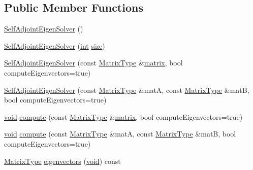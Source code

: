 \subsection*{Public Member Functions}
\begin{DoxyCompactItemize}
\item 
\hyperlink{class_self_adjoint_eigen_solver_af4cf372d440482d00ce9d00b9e8864df}{Self\-Adjoint\-Eigen\-Solver} ()
\item 
\hyperlink{class_self_adjoint_eigen_solver_ac3e972b81c5e3b2beb99f24a844be445}{Self\-Adjoint\-Eigen\-Solver} (\hyperlink{ioapi_8h_a787fa3cf048117ba7123753c1e74fcd6}{int} \hyperlink{glext_8h_a014d89bd76f74ef3a29c8f04b473eb76}{size})
\item 
\hyperlink{class_self_adjoint_eigen_solver_af0b2454eac09d3e0a2c3d9d3c101b9b0}{Self\-Adjoint\-Eigen\-Solver} (const \hyperlink{class_self_adjoint_eigen_solver_aa4841a3365da9edfb78e6aff605d7da8}{Matrix\-Type} \&\hyperlink{glext_8h_a7b24a3f2f56eb1244ae69dacb4fecb6f}{matrix}, bool compute\-Eigenvectors=true)
\item 
\hyperlink{class_self_adjoint_eigen_solver_af6aa13e264a4b5dfddd7c969af053e47}{Self\-Adjoint\-Eigen\-Solver} (const \hyperlink{class_self_adjoint_eigen_solver_aa4841a3365da9edfb78e6aff605d7da8}{Matrix\-Type} \&mat\-A, const \hyperlink{class_self_adjoint_eigen_solver_aa4841a3365da9edfb78e6aff605d7da8}{Matrix\-Type} \&mat\-B, bool compute\-Eigenvectors=true)
\item 
\hyperlink{group___u_a_v_objects_plugin_ga444cf2ff3f0ecbe028adce838d373f5c}{void} \hyperlink{class_self_adjoint_eigen_solver_a6f7111f1bdab30689238903a7907c07e}{compute} (const \hyperlink{class_self_adjoint_eigen_solver_aa4841a3365da9edfb78e6aff605d7da8}{Matrix\-Type} \&\hyperlink{glext_8h_a7b24a3f2f56eb1244ae69dacb4fecb6f}{matrix}, bool compute\-Eigenvectors=true)
\item 
\hyperlink{group___u_a_v_objects_plugin_ga444cf2ff3f0ecbe028adce838d373f5c}{void} \hyperlink{class_self_adjoint_eigen_solver_a61e3b8aa7a751b9829b47332eae9edc9}{compute} (const \hyperlink{class_self_adjoint_eigen_solver_aa4841a3365da9edfb78e6aff605d7da8}{Matrix\-Type} \&mat\-A, const \hyperlink{class_self_adjoint_eigen_solver_aa4841a3365da9edfb78e6aff605d7da8}{Matrix\-Type} \&mat\-B, bool compute\-Eigenvectors=true)
\item 
\hyperlink{class_self_adjoint_eigen_solver_aa4841a3365da9edfb78e6aff605d7da8}{Matrix\-Type} \hyperlink{class_self_adjoint_eigen_solver_ab365da01d8d433f4e250b9681093ec12}{eigenvectors} (\hyperlink{group___u_a_v_objects_plugin_ga444cf2ff3f0ecbe028adce838d373f5c}{void}) const 

\end{DoxyCompactItemize}
